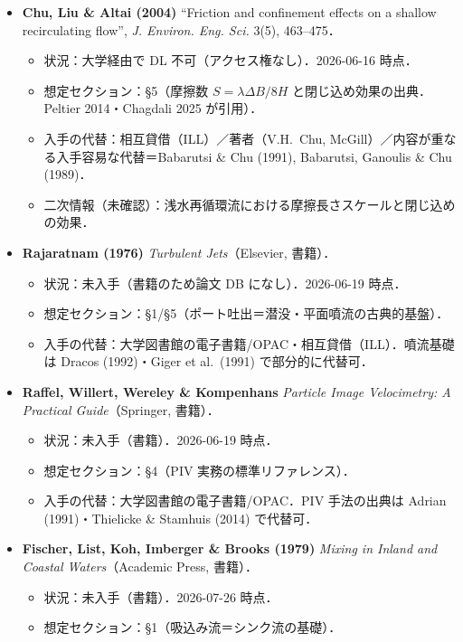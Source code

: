 \documentclass[11pt]{jsarticle}
\begin{document}
\begin{itemize}
  \item \textbf{Chu, Liu \& Altai (2004)} ``Friction and confinement effects on a shallow recirculating flow'', \textit{J. Environ. Eng. Sci.} 3(5), 463--475．
  \begin{itemize}
    \item 状況：大学経由で DL 不可（アクセス権なし）．2026-06-16 時点．
    \item 想定セクション：§5（摩擦数 $S = \lambda\Delta B/8H$ と閉じ込め効果の出典．Peltier 2014・Chagdali 2025 が引用）．
    \item 入手の代替：相互貸借（ILL）／著者（V.H.\ Chu, McGill）／内容が重なる入手容易な代替＝Babarutsi \& Chu (1991), Babarutsi, Ganoulis \& Chu (1989)．
    \item 二次情報（未確認）：浅水再循環流における摩擦長さスケールと閉じ込めの効果．
  \end{itemize}
  \item \textbf{Rajaratnam (1976)} \textit{Turbulent Jets}（Elsevier, 書籍）．
  \begin{itemize}
    \item 状況：未入手（書籍のため論文 DB になし）．2026-06-19 時点．
    \item 想定セクション：§1/§5（ポート吐出＝潜没・平面噴流の古典的基盤）．
    \item 入手の代替：大学図書館の電子書籍/OPAC・相互貸借（ILL）．噴流基礎は Dracos (1992)・Giger et al.\ (1991) で部分的に代替可．
  \end{itemize}
  \item \textbf{Raffel, Willert, Wereley \& Kompenhans} \textit{Particle Image Velocimetry: A Practical Guide}（Springer, 書籍）．
  \begin{itemize}
    \item 状況：未入手（書籍）．2026-06-19 時点．
    \item 想定セクション：§4（PIV 実務の標準リファレンス）．
    \item 入手の代替：大学図書館の電子書籍/OPAC．PIV 手法の出典は Adrian (1991)・Thielicke \& Stamhuis (2014) で代替可．
  \end{itemize}
  \item \textbf{Fischer, List, Koh, Imberger \& Brooks (1979)} \textit{Mixing in Inland and Coastal Waters}（Academic Press, 書籍）．
  \begin{itemize}
    \item 状況：未入手（書籍）．2026-07-26 時点．
    \item 想定セクション：§1（吸込み流＝シンク流の基礎）．

\end{itemize}
\end{itemize}
\end{document}
